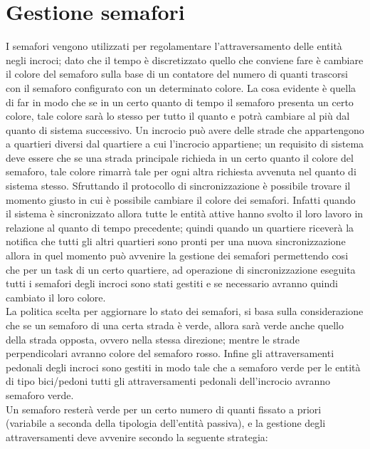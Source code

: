 \section{Gestione semafori}
I semafori vengono utilizzati per regolamentare l'attraversamento delle entità negli incroci; dato che il tempo è discretizzato quello che conviene fare è cambiare il colore del semaforo sulla base di un contatore del numero di quanti trascorsi con il semaforo configurato con un determinato colore. La cosa evidente è quella di far in modo che se in un certo quanto di tempo il semaforo presenta un certo colore, tale colore sarà lo stesso per tutto il quanto e potrà cambiare al più dal quanto di sistema successivo. Un incrocio può avere delle strade che appartengono a quartieri diversi dal quartiere a cui l'incrocio appartiene; un requisito di sistema deve essere che se una strada principale richieda in un certo quanto il colore del semaforo, tale colore rimarrà tale per ogni altra richiesta avvenuta nel quanto di sistema stesso. Sfruttando il protocollo di sincronizzazione è possibile trovare il momento giusto in cui è possibile cambiare il colore dei semafori. Infatti quando il sistema è sincronizzato allora tutte le entità attive hanno svolto il loro lavoro in relazione al quanto di tempo precedente; quindi quando un quartiere riceverà la notifica che tutti gli altri quartieri sono pronti per una nuova sincronizzazione allora in quel momento può avvenire la gestione dei semafori permettendo cosi che per un task di un certo quartiere, ad operazione di sincronizzazione eseguita tutti i semafori degli incroci sono stati gestiti e se necessario avranno quindi cambiato il loro colore.\\
La politica scelta per aggiornare lo stato dei semafori, si basa sulla considerazione che se un semaforo di una certa strada è verde, allora sarà verde anche quello della strada opposta, ovvero nella stessa direzione; mentre le strade perpendicolari avranno colore del semaforo rosso. Infine gli attraversamenti pedonali degli incroci sono gestiti in modo tale che a semaforo verde per le entità di tipo bici/pedoni tutti gli attraversamenti pedonali dell'incrocio avranno semaforo verde. \\
Un semaforo resterà verde per un certo numero di quanti fissato a priori (variabile a seconda della tipologia dell'entità passiva), e la gestione degli attraversamenti deve avvenire secondo la seguente strategia:
